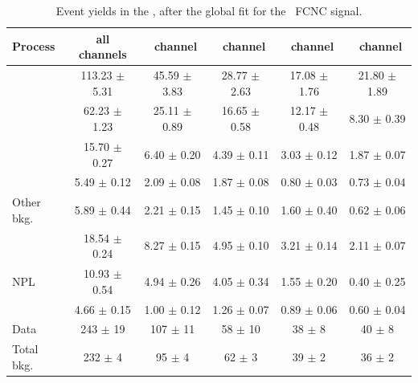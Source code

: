 \begin{landscape}
	\vspace*{\fill}
	
	\begin{table}[htbp]
		\centering
		\caption{Event yields in the \TTSR, after the global fit for the \Zut\ FCNC signal.  }	
		\begin{tabular} {l c c c c c}
			\toprule
			Process & all channels & \mumumu\ channel & \emumu\ channel & \eemu\ channel &\eee\ channel \\
			\midrule
			\NPL\ \DY  		& 113.23 $ \pm $  5.31 & 45.59 $\pm$  3.83 & 28.77 $\pm$  2.63 & 17.08 $\pm$ 1.76 & 21.80 $\pm$ 1.89 \\ 
			\ttZ 			&  62.23 $ \pm $  1.23 & 25.11 $\pm$  0.89 & 16.65 $\pm$  0.58 & 12.17 $\pm$ 0.48 &  8.30 $\pm$ 0.39 \\ 
			\WZ 			&  15.70 $ \pm $  0.27 &  6.40 $\pm$  0.20 &  4.39 $\pm$  0.11 &  3.03 $\pm$ 0.12 &  1.87 $\pm$ 0.07 \\ 
			\ZZ 			&   5.49 $ \pm $  0.12 &  2.09 $\pm$  0.08 &  1.87 $\pm$  0.08 & 0.80 $\pm$ 0.03 &  0.73 $\pm$ 0.04 \\ 
			Other bkg. 		&   5.89 $ \pm $  0.44 &  2.21 $\pm$  0.15 &  1.45 $\pm$  0.10 & 1.60 $\pm$ 0.40 &  0.62 $\pm$ 0.06\\ 
			\tZq 			&  18.54 $ \pm $  0.24 &  8.27 $\pm$  0.15 &  4.95 $\pm$  0.10 & 3.21 $\pm$ 0.14 &  2.11 $\pm$ 0.07\\ 
			NPL \ttbar      &   10.93 $ \pm $ 0.54 &  4.94 $\pm$  0.26 &  4.05 $\pm$  0.34 & 1.55 $\pm$ 0.20 &  0.40 $\pm$ 0.25 \B\\
			\kZut  			&   4.66 $ \pm $  0.15 &  1.00 $\pm$  0.12 &  1.26 $\pm$  0.07 & 0.89 $\pm$ 0.06 &  0.60 $\pm$ 0.04 \T\B\\
			\hdashline
			Data 			& 243 $ \pm $ 19 & 107 $\pm$ 11 & 58 $\pm$ 10 & 38 $\pm$ 8 & 40 $\pm$ 8 \T \\
			Total bkg. 	& 232 $ \pm $  4 &  95 $\pm$  4 & 62 $\pm$ 3 & 39 $\pm$ 2 & 36 $\pm$ 2 \\
			\bottomrule
		\end{tabular}
		\label{tab:PYieldTTSR}
	\end{table}
	
	
	\vspace*{\fill}
\end{landscape}
